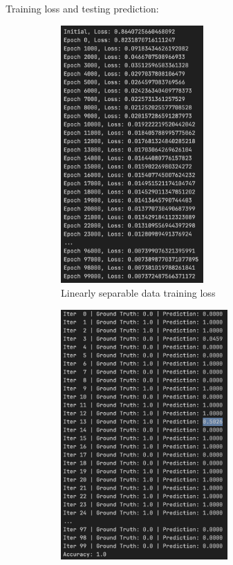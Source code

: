 \documentclass{homework}
\begin{document}
Training loss and testing prediction:

\begin{figure}[H]
    \centering
    \begin{subfigure}{0.45\textwidth}
        \centering
        \includegraphics[width=0.6\textwidth]{linear_train.png}
        \caption{Linearly separable data training loss}
    \end{subfigure}
    \begin{subfigure}{0.45\textwidth}
        \centering
        \includegraphics[width=0.7\textwidth]{linear_test.png}

\end{subfigure}
\end{figure}
\end{document}
